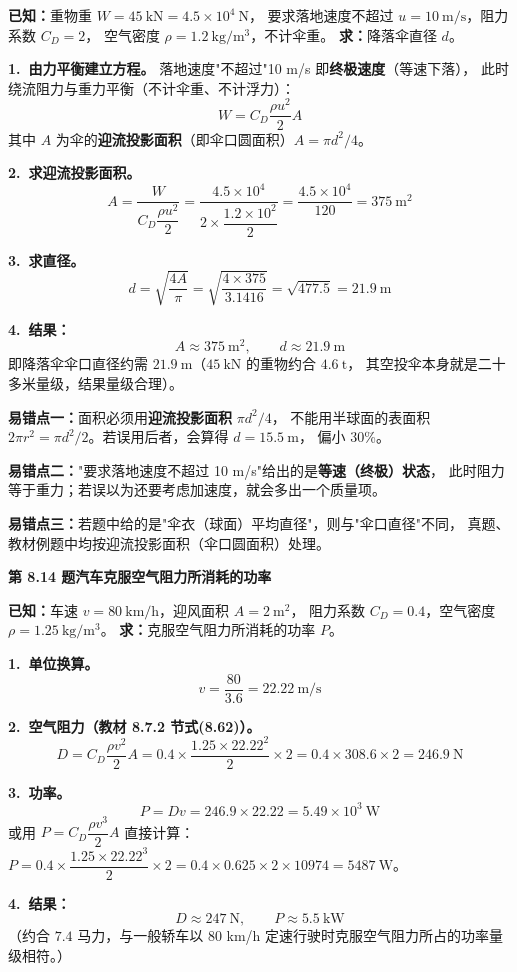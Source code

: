 \begin{jie}
\textbf{已知：}重物重 $W=45\ \mathrm{kN}=4.5\times10^4\ \mathrm{N}$，
要求落地速度不超过 $u=10\ \mathrm{m/s}$，阻力系数 $C_D=2$，
空气密度 $\rho=1.2\ \mathrm{kg/m^3}$，不计伞重。
\textbf{求：}降落伞直径 $d$。

\textbf{1.\ 由力平衡建立方程。}
落地速度"不超过"10 m/s 即\textbf{终极速度}（等速下落），
此时绕流阻力与重力平衡（不计伞重、不计浮力）：
\[
W=C_D\frac{\rho u^2}{2}A
\]
其中 $A$ 为伞的\textbf{迎流投影面积}（即伞口圆面积）$A=\pi d^2/4$。

\textbf{2.\ 求迎流投影面积。}
\[
A=\frac{W}{C_D\dfrac{\rho u^2}{2}}
=\frac{4.5\times10^4}{2\times\dfrac{1.2\times10^2}{2}}
=\frac{4.5\times10^4}{120}=375\ \mathrm{m^2}
\]

\textbf{3.\ 求直径。}
\[
d=\sqrt{\frac{4A}{\pi}}=\sqrt{\frac{4\times375}{3.1416}}=\sqrt{477.5}=21.9\ \mathrm{m}
\]

\textbf{4.\ 结果：}
\[
\boxed{\,A\approx375\ \mathrm{m^2},\qquad d\approx21.9\ \mathrm{m}\,}
\]
即降落伞伞口直径约需 $21.9\ \mathrm{m}$（$45\ \mathrm{kN}$ 的重物约合 $4.6\ \mathrm{t}$，
其空投伞本身就是二十多米量级，结果量级合理）。
\end{jie}

\begin{yicuo}
\textbf{易错点一：}面积必须用\textbf{迎流投影面积} $\pi d^2/4$，
不能用半球面的表面积 $2\pi r^2=\pi d^2/2$。若误用后者，会算得 $d=15.5\ \mathrm{m}$，
偏小 30\%。

\textbf{易错点二：}"要求落地速度不超过 10 m/s"给出的是\textbf{等速（终极）状态}，
此时阻力等于重力；若误以为还要考虑加速度，就会多出一个质量项。

\textbf{易错点三：}若题中给的是"伞衣（球面）平均直径"，则与"伞口直径"不同，
真题、教材例题中均按迎流投影面积（伞口圆面积）处理。
\end{yicuo}

\noindent\textbf{第 8.14 题\quad 汽车克服空气阻力所消耗的功率}

\begin{jie}
\textbf{已知：}车速 $v=80\ \mathrm{km/h}$，迎风面积 $A=2\ \mathrm{m^2}$，
阻力系数 $C_D=0.4$，空气密度 $\rho=1.25\ \mathrm{kg/m^3}$。
\textbf{求：}克服空气阻力所消耗的功率 $P$。

\textbf{1.\ 单位换算。}
\[
v=\frac{80}{3.6}=22.22\ \mathrm{m/s}
\]

\textbf{2.\ 空气阻力（教材 8.7.2 节式(8.62)）。}
\[
D=C_D\frac{\rho v^2}{2}A
=0.4\times\frac{1.25\times22.22^2}{2}\times2
=0.4\times308.6\times2=246.9\ \mathrm{N}
\]

\textbf{3.\ 功率。}
\[
P=Dv=246.9\times22.22=5.49\times10^3\ \mathrm{W}
\]
或用 $P=C_D\dfrac{\rho v^3}{2}A$ 直接计算：
$P=0.4\times\dfrac{1.25\times22.22^3}{2}\times2=0.4\times0.625\times2\times10974=5487\ \mathrm{W}$。

\textbf{4.\ 结果：}
\[
\boxed{\,D\approx247\ \mathrm{N},\qquad P\approx5.5\ \mathrm{kW}\,}
\]
（约合 $7.4$ 马力，与一般轿车以 80 km/h 定速行驶时克服空气阻力所占的功率量级相符。）
\end{jie}

